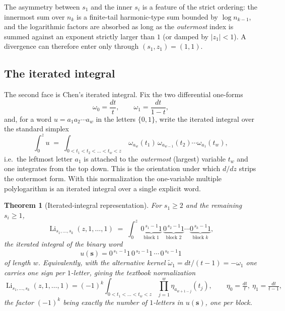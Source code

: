 \documentclass[11pt]{article}
\DeclareMathOperator{\Li}{Li}
\theoremstyle{plain}
\newtheorem{theorem}{Theorem}
\theoremstyle{remark}
\begin{document}
The asymmetry between $s_1$ and the inner $s_i$ is a feature of the strict ordering: the innermost sum over $n_k$ is a finite-tail harmonic-type sum bounded by $\log n_{k-1}$, and the logarithmic factors are absorbed as long as the \emph{outermost} index is summed against an exponent strictly larger than $1$ (or damped by $|z_1|<1$). A divergence can therefore enter only through $(s_1,z_1)=(1,1)$.

\subsection{The iterated integral}

The second face is Chen's iterated integral. Fix the two differential one-forms
\[
  \omega_0=\frac{dt}{t},\qquad \omega_1=\frac{dt}{1-t},
\]
and, for a word $u=a_1a_2\cdots a_w$ in the letters $\{0,1\}$, write the iterated integral over the standard simplex
\[
  \int_0^z u \;=\; \int_{0<t_1<t_2<\dots<t_w<z}\ \omega_{a_w}(t_1)\,\omega_{a_{w-1}}(t_2)\cdots\omega_{a_1}(t_w),
\]
i.e.\ the leftmost letter $a_1$ is attached to the \emph{outermost} (largest) variable $t_w$ and one integrates from the top down. This is the orientation under which $d/dz$ strips the outermost form. With this normalization the one-variable multiple polylogarithm is an iterated integral over a single explicit word.

\begin{theorem}[Iterated-integral representation]\label{thm:iter}
For $s_1\ge2$ and the remaining $s_i\ge1$,
\[
  \Li_{s_1,\dots,s_k}(z,1,\dots,1)
  \;=\;\int_0^z\ \underbrace{0^{\,s_1-1}1}_{\text{block }1}\,\underbrace{0^{\,s_2-1}1}_{\text{block }2}\cdots\underbrace{0^{\,s_k-1}1}_{\text{block }k},
\]
the iterated integral of the binary word
\[
  u(\mathbf s)=0^{\,s_1-1}1\,0^{\,s_2-1}1\,\cdots\,0^{\,s_k-1}1
\]
of length $w$. Equivalently, with the alternative kernel $\widetilde\omega_1=dt/(t-1)=-\omega_1$ one carries one sign per $1$-letter, giving the textbook normalization
\[
  \Li_{s_1,\dots,s_k}(z,1,\dots,1)=(-1)^k\!\!\int_{0<t_1<\dots<t_w<z}\!\!\prod_{j=1}^{w}\eta_{a_{w+1-j}}(t_j),\qquad
  \eta_0=\tfrac{dt}{t},\ \eta_1=\tfrac{dt}{t-1},
\]
the factor $(-1)^k$ being exactly the number of $1$-letters in $u(\mathbf s)$, one per block.
\end{theorem}
\end{document}
